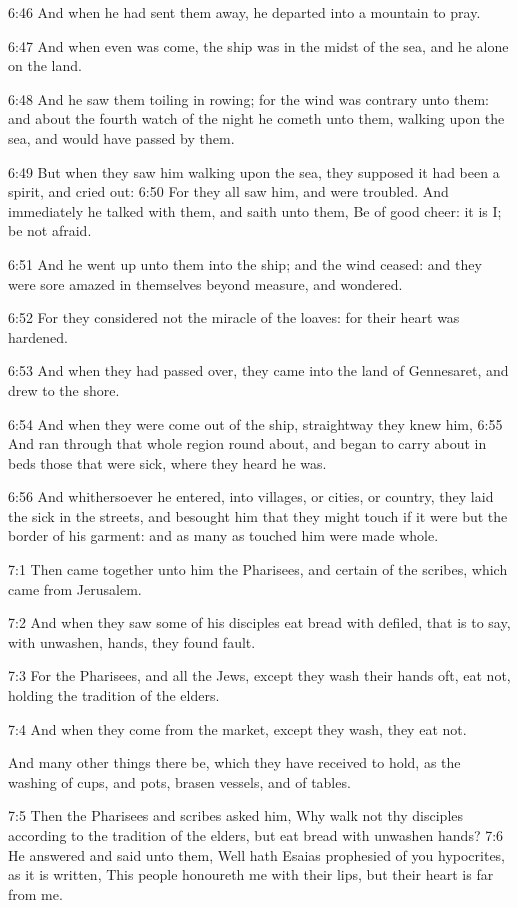 6:46 And when he had sent them away, he departed into a mountain to
pray.

6:47 And when even was come, the ship was in the midst of the sea, and
he alone on the land.

6:48 And he saw them toiling in rowing; for the wind was contrary unto
them: and about the fourth watch of the night he cometh unto them,
walking upon the sea, and would have passed by them.

6:49 But when they saw him walking upon the sea, they supposed it had
been a spirit, and cried out: 6:50 For they all saw him, and were
troubled. And immediately he talked with them, and saith unto them, Be
of good cheer: it is I; be not afraid.

6:51 And he went up unto them into the ship; and the wind ceased: and
they were sore amazed in themselves beyond measure, and wondered.

6:52 For they considered not the miracle of the loaves: for their
heart was hardened.

6:53 And when they had passed over, they came into the land of
Gennesaret, and drew to the shore.

6:54 And when they were come out of the ship, straightway they knew
him, 6:55 And ran through that whole region round about, and began to
carry about in beds those that were sick, where they heard he was.

6:56 And whithersoever he entered, into villages, or cities, or
country, they laid the sick in the streets, and besought him that they
might touch if it were but the border of his garment: and as many as
touched him were made whole.

7:1 Then came together unto him the Pharisees, and certain of the
scribes, which came from Jerusalem.

7:2 And when they saw some of his disciples eat bread with defiled,
that is to say, with unwashen, hands, they found fault.

7:3 For the Pharisees, and all the Jews, except they wash their hands
oft, eat not, holding the tradition of the elders.

7:4 And when they come from the market, except they wash, they eat
not.

And many other things there be, which they have received to hold, as
the washing of cups, and pots, brasen vessels, and of tables.

7:5 Then the Pharisees and scribes asked him, Why walk not thy
disciples according to the tradition of the elders, but eat bread with
unwashen hands?  7:6 He answered and said unto them, Well hath Esaias
prophesied of you hypocrites, as it is written, This people honoureth
me with their lips, but their heart is far from me.

